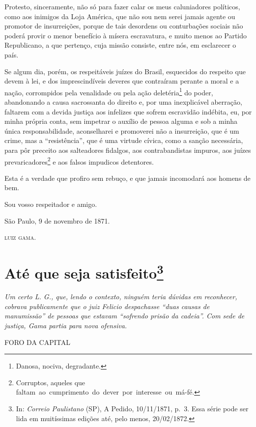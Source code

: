 {Protesto, sinceramente, não só para fazer calar os meus caluniadores
políticos, como aos inimigos da Loja América, que não sou nem serei
jamais agente ou promotor de insurreições, porque de tais desordens ou
conturbações sociais não poderá provir o menor benefício à mísera
escravatura, e muito menos ao Partido Republicano, a que pertenço, cuja
missão consiste, entre nós, em esclarecer o país.

Se algum dia, porém, os respeitáveis juízes do Brasil, esquecidos do
respeito que devem à lei, e dos imprescindíveis deveres que contraíram
perante a moral e a nação, corrompidos pela venalidade ou pela ação
deletéria\footnote{ Danosa, nociva, degradante.} do poder, abandonando
a causa sacrossanta do direito e, por uma inexplicável aberração,
faltarem com a devida justiça aos infelizes que sofrem escravidão
indébita, eu, por minha própria conta, sem impetrar o auxílio de pessoa
alguma e sob a minha única responsabilidade, aconselharei e promoverei
não a insurreição, que é um crime, mas a ``resistência'', que é uma
virtude cívica, como a sanção necessária, para pôr preceito aos
salteadores fidalgos, aos contrabandistas impuros, aos juízes
prevaricadores\footnote{ Corruptos, aqueles que
  faltam~ao~cumprimento~do~dever~por~interesse~ou~má-fé.} e aos falsos
impudicos detentores.

Esta é a verdade que profiro sem rebuço, e que jamais incomodará aos
homens de bem.

Sou vosso respeitador e amigo.

São Paulo, 9 de novembro de 1871.

\textsc{luiz gama}.

\chapter{Até que seja satisfeito\footnote{ In: \emph{Correio Paulistano} (SP), A Pedido, 10/11/1871,
  p.~3. Essa série pode ser lida em muitíssimas edições até, pelo menos,
  20/02/1872.}} %

\begin{didascalia}
\emph{Um certo L. G., que, lendo o contexto, ninguém teria dúvidas em
reconhecer, cobrava publicamente que o juiz Felicio despachasse ``duas
causas de manumissão'' de pessoas que estavam ``sofrendo prisão da
cadeia''. Com sede de justiça, Gama partia para nova ofensiva.}
\end{didascalia}

\asterisc{}

FORO DA CAPITAL

}
